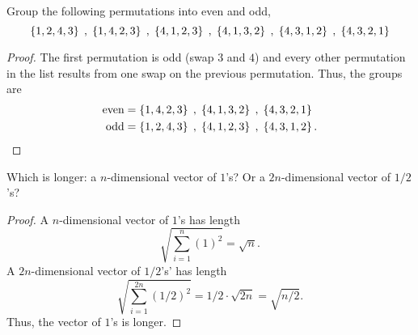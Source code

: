 \documentclass{tutorial}
\begin{document}
\begin{prob}[Permutations]
Group the following permutations into even and odd,
\[
  \left\{ 1, 2, 4, 3 \right\} \; , \;
  \left\{ 1, 4, 2, 3 \right\} \; , \;
  \left\{ 4, 1, 2, 3 \right\} \; , \;
  \left\{ 4, 1, 3, 2 \right\} \; , \;
  \left\{ 4, 3, 1, 2 \right\} \; , \;
  \left\{ 4, 3, 2, 1 \right\}
\]
\end{prob} \ifsolns \begin{proof}
The first permutation is odd (swap $3$ and $4$) and every other permutation in the list results from one swap on the previous permutation. Thus, the groups are
\begin{align*}
  \text{even} &= \left\{ 1, 4, 2, 3 \right\} \; , \; \left\{ 4, 1, 3, 2 \right\} \; , \; \left\{ 4, 3, 2, 1 \right\} \\
  \text{odd}  &= \left\{ 1, 2, 4, 3 \right\} \; , \; \left\{ 4, 1, 2, 3 \right\} \; , \; \left\{ 4, 3, 1, 2 \right\} .
\end{align*}
\end{proof}\else \vspace{2in} \fi


\begin{prob}
Which is longer: a $n$-dimensional vector of $1$'s? Or a $2n$-dimensional vector of $1/2$'s?
\end{prob} \ifsolns \begin{proof}
A $n$-dimensional vector of $1$'s has length
\[ \sqrt{\sum_{i=1}^n (1)^2} = \sqrt{n} . \]
A $2n$-dimensional vector of $1/2$'s' has length
\[ \sqrt{\sum_{i=1}^{2n} (1/2)^2} = 1/2 \cdot \sqrt{2n} = \sqrt{n/2} . \]
Thus, the vector of $1$'s is longer.
\end{proof}\else \vspace{2in} \fi
\end{document}

